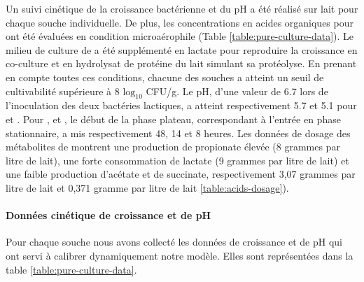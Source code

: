 Un suivi cinétique de la croissance bactérienne et du pH a été réalisé sur lait pour chaque souche individuelle. De plus, les concentrations en acides organiques pour \freud ont été évaluées en condition microaérophile (Table \ref{table:pure-culture-data}). Le milieu de culture de \freud a été supplémenté en lactate pour reproduire la croissance en co-culture et en hydrolysat de protéine du lait simulant sa protéolyse. En prenant en compte toutes ces conditions, chacune des souches a atteint un seuil de cultivabilité supérieure à 8 $\text{log}_{10}$ CFU/g. Le pH, d'une valeur de 6.7 lors de l'inoculation des deux bactéries lactiques, a atteint respectivement 5.7 et 5.1 pour \plantarum et \lactis. Pour \freud, \plantarum et \lactis, le début de la phase plateau, correspondant à l'entrée en phase stationnaire, a mis respectivement 48, 14 et 8 heures. Les données de dosage des métabolites de \freud montrent une production de propionate élevée (8 grammes par litre de lait), une forte consommation de lactate (9 grammes par litre de lait) et une faible production d'acétate et de succinate, respectivement 3,07 grammes par litre de lait et 0,371 gramme par litre de lait \ref{table:acids-dosage}). 

\paragraph*{Données cinétique de croissance et de pH}
Pour chaque souche nous avons collecté les données de croissance et de pH qui ont servi à calibrer dynamiquement notre modèle. Elles sont représentées dans la table \ref{table:pure-culture-data}.

